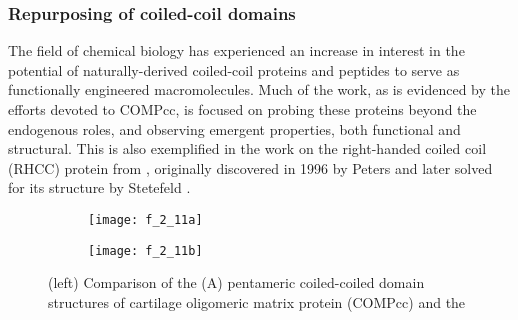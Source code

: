 \begin{refsection}
\begin{figure}[h!]
    \label{fig:our_COMP} \end{figure}
\subsubsection{Repurposing of coiled-coil domains}

The field of chemical biology has experienced an increase in interest in the
potential of naturally-derived coiled-coil proteins and peptides to serve as
functionally engineered macromolecules. Much of the work, as is evidenced by the
efforts devoted to
COMPcc, is focused on probing these proteins
beyond the endogenous roles, and observing emergent properties, both functional
and structural.\cite{McFarlane2012,McFarlane2009,Ozbek2002,Gunasekar2009,Gunasekar2012,Guo1998} This is also exemplified in the work on the right-handed coiled
coil (RHCC) protein from , originally discovered
in 1996 by Peters  and later solved for its structure by Stetefeld
.\cite{Peters1996,Stetefeld2000} 
\begin{figure}[h!]
    \centering
    \begin{subfigure}[b]{0.45\textwidth}
        \texttt{[image: f\_2\_11a]}
        \label{fig:coil_comparison}
    \end{subfigure}
    \begin{subfigure}[b]{0.45\textwidth}
        \texttt{[image: f\_2\_11b]}
        \label{fig:coil_localization}
    \end{subfigure}
    \caption[(left) Comparison of the (A) pentameric coiled-coiled domain
        structures of cartilage oligomeric matrix protein (COMP) and the
        (B) tetrameric right-handed coiled-coil (RHCC). The cavities that are
        highlighted in yellow in the model depict the van der Waals spheres that
        define the cavities, in which small molecules can embed themselves.
        Volumetric dimensions of these spaces are depicted along the length of
        the figure.
        (right) Confocal fluorescence micrograph of FaDu cells administered with
        RHCC, conjugated to Alexa Fluor 488 SDP, after incubation or 8 h at
        \SI{37}{\celsius}, collected by Eriksson. Blue channel assigned to
        DAPI-staining of nuclear DNA. Green channel assigned to dye-conjugated
        RHCC.]{(left) Comparison of the (A) pentameric coiled-coiled domain
        structures of cartilage oligomeric matrix protein (COMPcc) and the
}
\end{figure}
\end{refsection}
